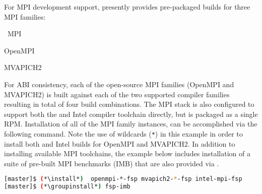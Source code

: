 For MPI development support, \OHPC{} presently provides pre-packaged builds for
three MPI families: 

\begin{itemize*}
\item \Intel{}~MPI
\item OpenMPI
\item MVAPICH2
\end{itemize*}
 For ABI consistency, each of the open-source MPI families (OpenMPI and
 MVAPICH2) is built against each of the two supported compiler families
 resulting in total of four build combinations.  The \Intel{} MPI stack is also
 configured to support both the \GNU{} and Intel compiler toolchain directly, but
 is packaged as a single RPM. Installation of all of the MPI family instances,
 can be accomplished via the following command. Note the use of wildcards
 (\texttt{*}) in this example in order to install both \GNU{} and Intel builds for
 OpenMPI and MVAPICH2. In addition to installing available MPI toolchains,
 the example below includes installation of a suite of pre-built MPI
 benchmarks (IMB) that are also provided via \OHPC{}.

\begin{lstlisting}[language=bash]
[master]$ (*\install*)  openmpi-*-fsp mvapich2-*-fsp intel-mpi-fsp
[master]$ (*\groupinstall*) fsp-imb
\end{lstlisting}
